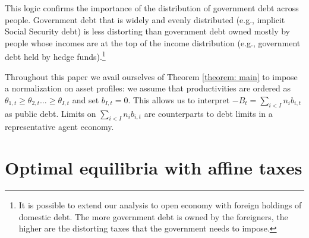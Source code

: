 \documentclass[thmsb,11pt]{article}
\begin{document}
This logic confirms the importance of  the distribution of government debt across people. Government debt that is widely and evenly distributed
(e.g., implicit Social Security debt) is less distorting than
 government debt owned mostly by people whose incomes are at the top of the income
distribution (e.g., government debt held by hedge funds).\footnote{%
It is possible to extend our analysis to open economy with foreign
holdings of domestic debt. The more government debt is owned by the
foreigners, the higher are the distorting taxes that  the government  needs to
impose.}
\color{black}
%

Throughout this paper we avail ourselves of Theorem \ref{theorem: main} to impose a normalization on  asset profiles:
we assume that productivities are ordered as  $\theta_{1,t}\geq\theta_{2,t}\ldots\geq \theta_{I,t}$ and set $b_{I,t}=0$. This allows us to interpret $-B_t=\sum_{i<I}n_ib_{i,t}$ as
public debt. Limits on $\sum_{i<I}n_ib_{i,t}$ are counterparts  to  debt limits in a representative agent economy.
%
%

\color{black}

\section{Optimal equilibria with affine taxes}\label{sec: Ramsey Plan}
\end{document}
